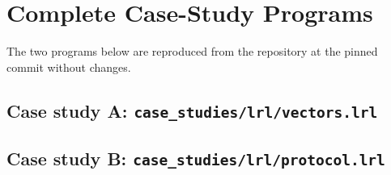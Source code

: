 \onecolumn
\section{Complete Case-Study Programs}\label{app:listings}

The two programs below are reproduced from the repository at the pinned commit without changes.

\subsection*{Case study A: \texttt{case\_studies/lrl/vectors.lrl}}


\subsection*{Case study B: \texttt{case\_studies/lrl/protocol.lrl}}

